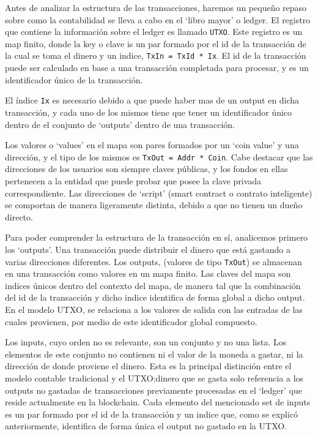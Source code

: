 \documentclass[12pt]{book}
\begin{document}

Antes de analizar la estructura de las transacciones, haremos un pequeño repaso sobre como la contabilidad se lleva a cabo en el `libro mayor' o ledger. El registro que contiene la información sobre el ledger es llamado \texttt{UTXO}. Este registro es un map finito, donde la key o clave is un par formado por el id de la transacción de la cual se toma el dinero y un indice, \texttt{TxIn = TxId * Ix}. El id de la transacción puede ser calculado en base a una transacción completada para procesar, y es un identificador único de la transacción.

El índice \texttt{Ix} es necesario debido a que puede haber mas de un output en dicha transacción, y cada uno de los mismos tiene que tener un identificador único dentro de el conjunto de `outputs' dentro de una transacción.

Los valores o `values' en el mapa son pares formados por un `coin value' y una dirección, y el tipo de los mismos es \texttt{TxOut = Addr * Coin}. Cabe destacar que las direcciones de los usuarios son siempre claves públicas, y los fondos en ellas pertenecen a la entidad que puede probar que posee la clave privada correspondiente. Las direcciones de `script' (smart contract o contrato inteligente) se comportan de manera ligeramente distinta, debido a que no tienen un dueño directo.

Para poder comprender la estructura de la transacción en sí, analicemos primero los `outputs'. Una transacción puede distribuir el dinero que está gastando a varias direcciones diferentes. Los outputs, (valores de tipo \texttt{TxOut}) se almacenan en una transacción como valores en un mapa finito.
Las claves del mapa son indices únicos dentro del contexto del mapa, de manera tal que la combinación del id de la transacción y dicho indice identifica de forma global a dicho output.
En el modelo UTXO, se relaciona a los valores de salida con las entradas de las cuales provienen, por medio de este identificador global compuesto.


Los inputs, cuyo orden no es relevante, son un conjunto y no una lista. Los elementos de este conjunto no contienen ni el valor de la moneda a gastar, ni la dirección de donde proviene el dinero. Esta es la principal distinción entre el modelo contable tradicional y el UTXO:\@el dinero que se gasta solo referencia a los outputs no gastadas de transacciones previamente procesadas en el `ledger' que reside actualmente en la blockchain. Cada elemento del mencionado set de inputs es un par formado por el id de la transacción y un indice que, como se explicó anteriormente, identifica de forma única el output no gastado en la UTXO.\@
\end{document}

